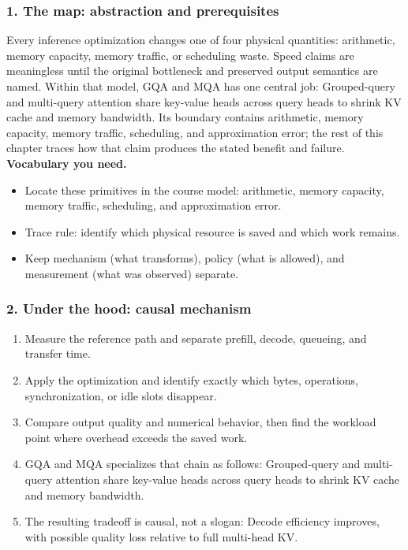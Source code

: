 \subsubsection*{1. The map: abstraction and prerequisites}
Every inference optimization changes one of four physical quantities: arithmetic, memory capacity, memory traffic, or scheduling waste. Speed claims are meaningless until the original bottleneck and preserved output semantics are named.
Within that model, GQA and MQA has one central job: Grouped-query and multi-query attention share key-value heads across query heads to shrink KV cache and memory bandwidth. Its boundary contains arithmetic, memory capacity, memory traffic, scheduling, and approximation error; the rest of this chapter traces how that claim produces the stated benefit and failure.
\textbf{Vocabulary you need.}\begin{itemize}
\item Locate these primitives in the course model: arithmetic, memory capacity, memory traffic, scheduling, and approximation error.
\item Trace rule: identify which physical resource is saved and which work remains.
\item Keep mechanism (what transforms), policy (what is allowed), and measurement (what was observed) separate.
\end{itemize}
\subsubsection*{2. Under the hood: causal mechanism}\begin{enumerate}
\item Measure the reference path and separate prefill, decode, queueing, and transfer time.
\item Apply the optimization and identify exactly which bytes, operations, synchronization, or idle slots disappear.
\item Compare output quality and numerical behavior, then find the workload point where overhead exceeds the saved work.
\item GQA and MQA specializes that chain as follows: Grouped-query and multi-query attention share key-value heads across query heads to shrink KV cache and memory bandwidth.
\item The resulting tradeoff is causal, not a slogan: Decode efficiency improves, with possible quality loss relative to full multi-head KV.
\end{enumerate}
